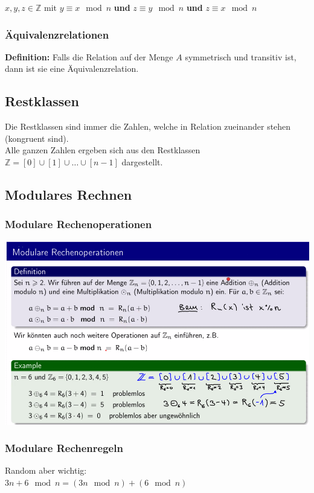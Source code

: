\documentclass[12pt]{scrartcl}
\begin{document}
$x,y,z \in \mathbb{Z} \text{ mit } y \equiv x \mod n$ \textbf{und} $z \equiv y \mod n$ \textbf{und} $z \equiv x \mod n$\\


\subsubsection{Äquivalenzrelationen}
\textbf{Definition:} Falls die Relation auf der Menge $A$ symmetrisch und transitiv ist, dann ist sie 
eine Äquivalenzrelation.\\

\subsection{Restklassen}
Die Restklassen sind immer die Zahlen, welche in Relation zueinander stehen (kongruent sind).\\

Alle ganzen Zahlen ergeben sich aus den Restklassen $\mathbb{Z} = [0] \cup [1] \cup \dots \cup [n-1]$ dargestellt.\\

\subsection{Modulares Rechnen}
\subsubsection{Modulare Rechenoperationen}
\includegraphics[width=14cm]{img/modulare_rechenoperationen.png}


\subsubsection{Modulare Rechenregeln}
Random aber wichtig:\\
$3n + 6 \mod n = (3n \mod n) + (6 \mod n)$
\end{document}
